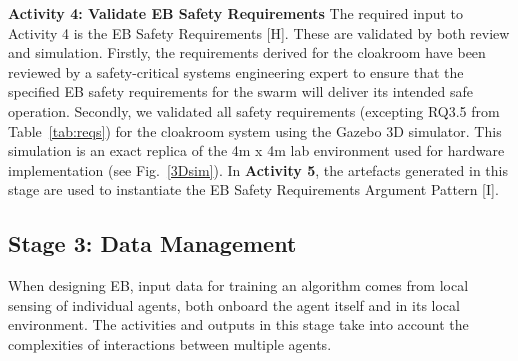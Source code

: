\documentclass[runningheads]{llncs}
\begin{document}




\noindent\textbf{Activity 4: Validate EB Safety Requirements} The required input to Activity 4 is the EB Safety Requirements [H].  
These
are validated by both review and simulation.
Firstly, the requirements derived for the cloakroom have been reviewed by a safety-critical systems engineering expert to ensure that the specified EB safety requirements for the swarm will deliver its intended safe operation. Secondly, we validated all safety requirements (excepting RQ3.5 from Table~\ref{tab:reqs}) for the cloakroom system using the Gazebo 3D simulator. 
This simulation is an exact replica of the 4m x 4m lab environment used for hardware implementation (see Fig.~\ref{3Dsim}). 
In \textbf{Activity 5}, the artefacts generated in this stage are used to instantiate the EB Safety Requirements Argument Pattern [I].


\subsection{Stage 3: Data Management} \label{framework-stage3}
When designing EB, input data for training an algorithm comes from local sensing of individual agents, both onboard the agent itself and in its local environment. The activities and outputs in this stage take into account the complexities of interactions between multiple agents.
\end{document}
